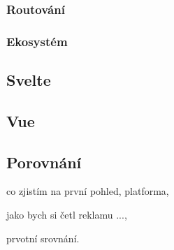 \subsubsection{Routování}
\subsubsection{Ekosystém}



\subsection{Svelte}

\subsection{Vue}

\subsection{Porovnání}

\begin{citemize}
	\item co zjistím na první pohled, platforma,
	\item jako bych si četl reklamu ...,
	\item prvotní srovnání.
\end{citemize}
